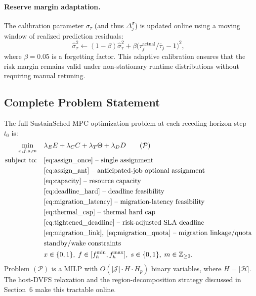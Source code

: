 \documentclass[a4paper,fleqn]{cas-dc}
\begin{document}
\paragraph{Reserve margin adaptation.}
The calibration parameter $\sigma_\tau$ (and thus $\Delta^\sigma_j$) is updated online using a moving window of realized prediction residuals:
\begin{equation}
\label{eq:sigma_update}
\hat{\sigma}^2_\tau \leftarrow (1-\beta)\hat{\sigma}^2_\tau + \beta \bigl(\tau^{\mathrm{actual}}_j / \bar{\tau}_j - 1\bigr)^2,
\end{equation}
where $\beta = 0.05$ is a forgetting factor. This adaptive calibration ensures that the risk margin remains valid under non-stationary runtime distributions without requiring manual retuning.

\subsection{Complete Problem Statement}
\label{sec:complete_problem}

The full SustainSched-MPC optimization problem at each receding-horizon step $t_0$ is:
\begin{align}
\label{eq:full_problem}
\min_{x,f,s,m}\quad & \lambda_E E + \lambda_C C + \lambda_T \Theta + \lambda_D D \tag{$\mathcal{P}$} \\
\text{subject to:}\quad
& \eqref{eq:assign_once}\text{ -- single assignment} \nonumber\\
& \eqref{eq:assign_ant}\text{ -- anticipated-job optional assignment} \nonumber\\
& \eqref{eq:capacity}\text{ -- resource capacity} \nonumber\\
& \eqref{eq:deadline_hard}\text{ -- deadline feasibility} \nonumber\\
& \eqref{eq:migration_latency}\text{ -- migration-latency feasibility} \nonumber\\
& \eqref{eq:thermal_cap}\text{ -- thermal hard cap} \nonumber\\
& \eqref{eq:tightened_deadline}\text{ -- risk-adjusted SLA deadline} \nonumber\\
& \eqref{eq:migration_link},\;\eqref{eq:migration_quota}\text{ -- migration linkage/quota} \nonumber\\
& \text{standby/wake constraints} \nonumber\\
& x \in \{0,1\},\; f \in [f^{\min}_h, f^{\max}_h],\; s \in \{0,1\},\; m \in \mathbb{Z}_{\geq 0}. \nonumber
\end{align}
Problem $(\mathcal{P})$ is a MILP with $O(|\mathcal{J}| \cdot H \cdot H_p)$ binary variables, where $H = |\mathcal{H}|$. The host-DVFS relaxation and the region-decomposition strategy discussed in Section~6 make this tractable online.
\end{document}
